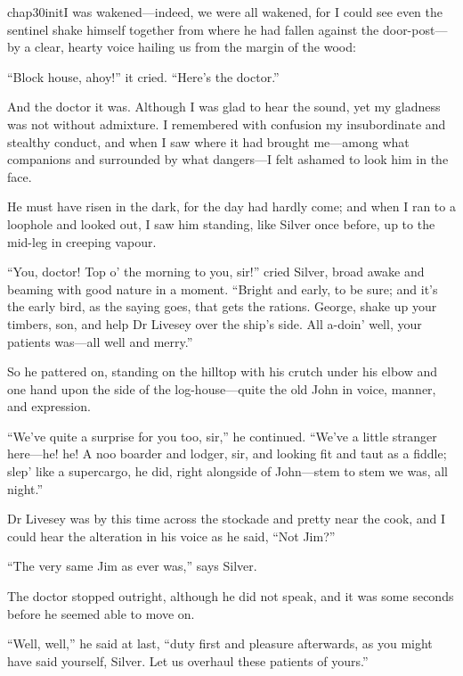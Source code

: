 
   \lettrine[lines=4,image=true]{chap30initI}{} was wakened---indeed, we were all wakened, for I could see even the sentinel shake himself together from where he had fallen against the door-post---by a clear, hearty voice hailing us from the margin of the wood:

\enquote{Block house, ahoy!} it cried. \enquote{Here’s the doctor.}

And the doctor it was. Although I was glad to hear the sound, yet my gladness was not without admixture. I remembered with confusion my insubordinate and stealthy conduct, and when I saw where it had brought me---among what companions and surrounded by what dangers---I felt ashamed to look him in the face.

He must have risen in the dark, for the day had hardly come; and when I ran to a loophole and looked out, I saw him standing, like Silver once before, up to the mid-leg in creeping vapour.

\enquote{You, doctor! Top o’ the morning to you, sir!} cried Silver, broad awake and beaming with good nature in a moment. \enquote{Bright and early, to be sure; and it’s the early bird, as the saying goes, that gets the rations. George, shake up your timbers, son, and help Dr Livesey over the ship’s side. All a-doin’ well, your patients was---all well and merry.}

So he pattered on, standing on the hilltop with his crutch under his elbow and one hand upon the side of the log-house---quite the old John in voice, manner, and expression.

\enquote{We’ve quite a surprise for you too, sir,} he continued. \enquote{We’ve a little stranger here---he! he! A noo boarder and lodger, sir, and looking fit and taut as a fiddle; slep’ like a supercargo, he did, right alongside of John---stem to stem we was, all night.}

Dr Livesey was by this time across the stockade and pretty near the cook, and I could hear the alteration in his voice as he said, \enquote{Not Jim?}

\enquote{The very same Jim as ever was,} says Silver.

The doctor stopped outright, although he did not speak, and it was some seconds before he seemed able to move on.

\enquote{Well, well,} he said at last, \enquote{duty first and pleasure afterwards, as you might have said yourself, Silver. Let us overhaul these patients of yours.}

